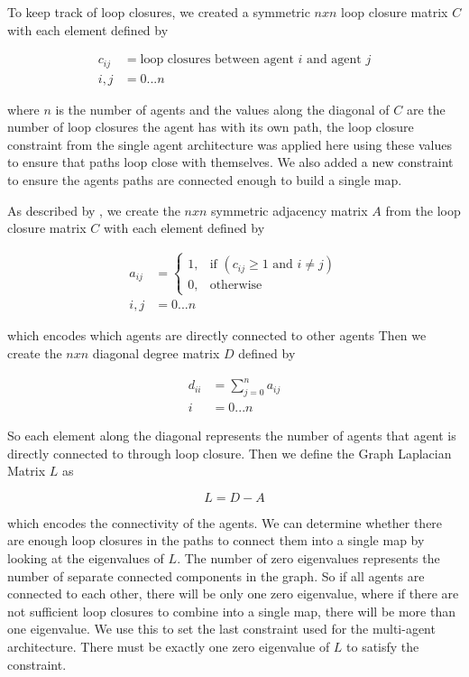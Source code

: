 \documentclass[letterpaper, 10 pt, conference]{ieeeconf}  %
\begin{document}
To keep track of loop closures, we created a symmetric $nxn$ loop closure matrix $C$ with each element defined by

\begin{align}
  c_{ij} &= \text{loop closures between agent } i \text{ and agent } j \\
  i,j &= 0...n \nonumber
\end{align}

where $n$ is the number of agents and the values along the diagonal of $C$ are the number of loop closures the agent has with its own path, the loop closure constraint from the single agent architecture was applied here using these values to ensure that paths loop close with themselves. We also added a new constraint to ensure the agents paths are connected enough to build a single map.

As described by \cite{Weisstein}, we create the $nxn$ symmetric adjacency matrix $A$ from the loop closure matrix $C$ with each element defined by

\begin{align}
  a_{ij} &=
  \begin{cases}
    1, & \text{if } (c_{ij} \geq 1 \text{ and } i \neq j)\\
    0, & \text{otherwise}
  \end{cases}\\
  i,j &=0 ...n \nonumber
\end{align}

which encodes which agents are directly connected to other agents
Then we create the $nxn$ diagonal degree matrix $D$ defined by

\begin{align}
  d_{ii} &= \sum_{j=0}^{n} a_{ij} \\
  i &= 0 ... n \nonumber
\end{align}

So each element along the diagonal represents the number of agents that agent is directly connected to through loop closure. Then we define the Graph Laplacian Matrix $L$ as

\begin{equation}
  L = D-A
\end{equation}

which encodes the connectivity of the agents. We can determine whether there are enough loop closures in the paths to connect them into a single map by looking at the eigenvalues of $L$. The number of zero eigenvalues represents the number of separate connected components in the graph. So if all agents are connected to each other, there will be only one zero eigenvalue, where if there are not sufficient loop closures to combine into a single map, there will be more than one eigenvalue. We use this to set the last constraint used for the multi-agent architecture. There must be exactly one zero eigenvalue of $L$ to satisfy the constraint.
\end{document}
